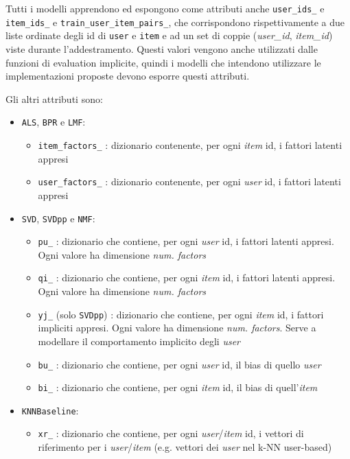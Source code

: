 Tutti i modelli apprendono ed espongono come attributi anche \texttt{user\_ids\_} e \texttt{item\_ids\_} e \texttt{train\_user\_item\_pairs\_}, che corrispondono rispettivamente a due liste ordinate degli id di \texttt{user} e \texttt{item} e ad un set di coppie (\textit{user\_id}, \textit{item\_id}) viste durante l'addestramento. Questi valori vengono anche utilizzati dalle funzioni di evaluation implicite, quindi i modelli che intendono utilizzare le implementazioni proposte devono esporre questi attributi.

Gli altri attributi sono:

\begin{itemize}
    \item \texttt{ALS}, \texttt{BPR} e \texttt{LMF}:
    \begin{itemize}
        \item \texttt{item\_factors\_} : dizionario contenente, per ogni \textit{item} id, i fattori latenti appresi
        \item \texttt{user\_factors\_} : dizionario contenente, per ogni \textit{user} id, i fattori latenti appresi
    \end{itemize}
    \item \texttt{SVD}, \texttt{SVDpp} e \texttt{NMF}:
    \begin{itemize}
        \item \texttt{pu\_} : dizionario che contiene, per ogni \textit{user} id, i fattori latenti appresi. Ogni valore ha dimensione \textit{num. factors}
        \item \texttt{qi\_} : dizionario che contiene, per ogni \textit{item} id, i fattori latenti appresi. Ogni valore ha dimensione \textit{num. factors}
        \item \texttt{yj\_} (solo \texttt{SVDpp}) : dizionario che contiene, per ogni \textit{item} id, i fattori impliciti appresi. Ogni valore ha dimensione \textit{num. factors}. Serve a modellare il comportamento implicito degli \textit{user}
        \item \texttt{bu\_} : dizionario che contiene, per ogni \textit{user} id, il bias di quello \textit{user}
        \item \texttt{bi\_} : dizionario che contiene, per ogni \textit{item} id, il bias di quell'\textit{item}
    \end{itemize}
    \item \texttt{KNNBaseline}: 
    \begin{itemize}
        \item \texttt{xr\_} : dizionario che contiene, per ogni \textit{user}/\textit{item} id, i vettori di riferimento per i \textit{user}/\textit{item} (e.g. vettori dei \textit{user} nel k-NN user-based)

\end{itemize}
\end{itemize}
